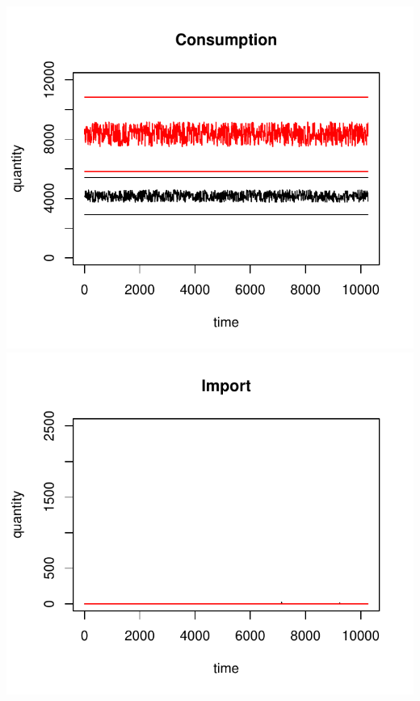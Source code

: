 \documentclass{article}
\begin{document}
\vskip2mm
\hskip-1cm
\includegraphics[scale=0.5]{fig_case02_consumption}
\includegraphics[scale=0.5]{fig_case02_import}
\end{document}
